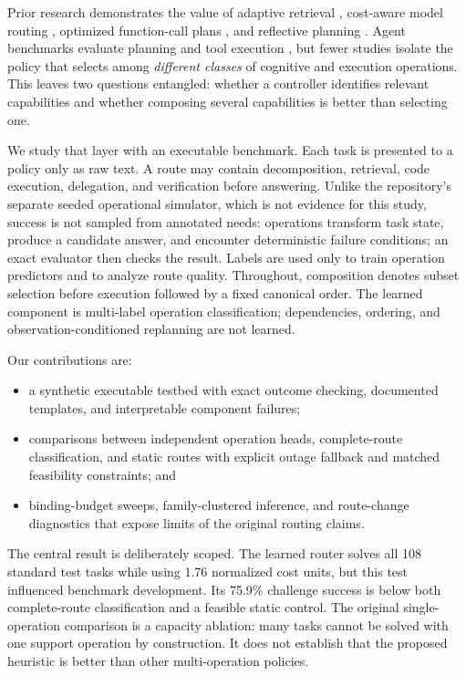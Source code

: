 \documentclass[letterpaper]{article} %
\begin{document}
Prior research demonstrates the value of adaptive retrieval \citep{jeong2024adaptiverag}, cost-aware model routing \citep{chen2024frugalgpt,ong2025routellm}, optimized function-call plans \citep{kim2024llmcompiler}, and reflective planning \citep{yao2023react,zhang2026spiral}. Agent benchmarks evaluate planning and tool execution \citep{liu2024agentbench,yao2024taubench}, but fewer studies isolate the policy that selects among \emph{different classes} of cognitive and execution operations. This leaves two questions entangled: whether a controller identifies relevant capabilities and whether composing several capabilities is better than selecting one.

We study that layer with an executable benchmark. Each task is presented to a policy only as raw text. A route may contain decomposition, retrieval, code execution, delegation, and verification before answering. Unlike the repository's separate seeded operational simulator, which is not evidence for this study, success is not sampled from annotated needs: operations transform task state, produce a candidate answer, and encounter deterministic failure conditions; an exact evaluator then checks the result. Labels are used only to train operation predictors and to analyze route quality. Throughout, composition denotes subset selection before execution followed by a fixed canonical order. The learned component is multi-label operation classification; dependencies, ordering, and observation-conditioned replanning are not learned.

Our contributions are:
\begin{itemize}
    \item a synthetic executable testbed with exact outcome checking, documented templates, and interpretable component failures;
    \item comparisons between independent operation heads, complete-route classification, and static routes with explicit outage fallback and matched feasibility constraints; and
    \item binding-budget sweeps, family-clustered inference, and route-change diagnostics that expose limits of the original routing claims.
\end{itemize}

The central result is deliberately scoped. The learned router solves all 108 standard test tasks while using 1.76 normalized cost units, but this test influenced benchmark development. Its 75.9\% challenge success is below both complete-route classification and a feasible static control. The original single-operation comparison is a capacity ablation: many tasks cannot be solved with one support operation by construction. It does not establish that the proposed heuristic is better than other multi-operation policies.
\end{document}
